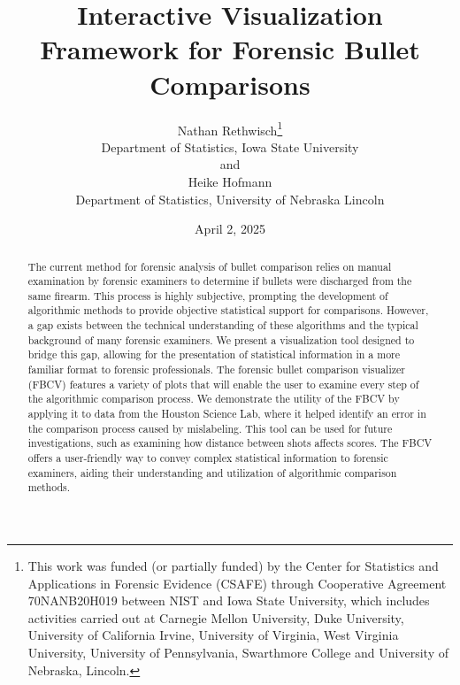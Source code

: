 \documentclass[
  12pt]{article}
\begin{document}
\def\spacingset#1{\renewcommand{\baselinestretch}%
{#1}\small\normalsize} \spacingset{1}



\date{April 2, 2025}
\title{\bf Interactive Visualization Framework for Forensic Bullet
Comparisons}
\author{
Nathan Rethwisch\thanks{This work was funded (or partially funded) by
the Center for Statistics and Applications in Forensic Evidence (CSAFE)
through Cooperative Agreement 70NANB20H019 between NIST and Iowa State
University, which includes activities carried out at Carnegie Mellon
University, Duke University, University of California Irvine, University
of Virginia, West Virginia University, University of Pennsylvania,
Swarthmore College and University of Nebraska, Lincoln.}\\
Department of Statistics, Iowa State University\\
and\\Heike Hofmann\\
Department of Statistics, University of Nebraska Lincoln\\
}
\maketitle

\bigskip
\bigskip
\begin{abstract}
The current method for forensic analysis of bullet comparison relies on
manual examination by forensic examiners to determine if bullets were
discharged from the same firearm. This process is highly subjective,
prompting the development of algorithmic methods to provide objective
statistical support for comparisons. However, a gap exists between the
technical understanding of these algorithms and the typical background
of many forensic examiners. We present a visualization tool designed to
bridge this gap, allowing for the presentation of statistical
information in a more familiar format to forensic professionals. The
forensic bullet comparison visualizer (FBCV) features a variety of plots
that will enable the user to examine every step of the algorithmic
comparison process. We demonstrate the utility of the FBCV by applying
it to data from the Houston Science Lab, where it helped identify an
error in the comparison process caused by mislabeling. This tool can be
used for future investigations, such as examining how distance between
shots affects scores. The FBCV offers a user-friendly way to convey
complex statistical information to forensic examiners, aiding their
understanding and utilization of algorithmic comparison methods.
\end{abstract}
\end{document}
